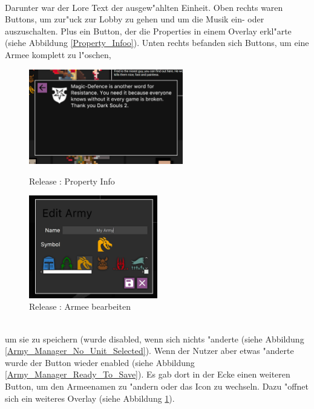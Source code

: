 \documentclass[12pt, titlepage]{scrartcl}
\newcommand{\RN}[1]{%
	\textup{\uppercase\expandafter{\romannumeral#1}}%
}
\begin{document}
			    \ \\ Darunter war der Lore Text der ausgew"ahlten Einheit. Oben rechts waren Buttons, um zur"uck zur Lobby zu gehen und um die Musik ein- oder auszuschalten. Plus ein Button, der die Properties in einem Overlay erkl"arte (siehe Abbildung \ref{Property_Infoo}). Unten rechts befanden sich Buttons, um eine Armee komplett zu l"oschen, \\
			    \begin{figure}[H]
                    \centering
                    \begin{minipage}{0.6\textwidth}
                        \centering
                        \includegraphics[width=0.6\textwidth]{images/old_state/army_manager/PropertyInfo.png}
                        \caption{Release \RN{2}: Property Info}
                        \label{Property_Infoo}
                    \end{minipage}%
                    \begin{minipage}{0.5\textwidth}
                        \centering
                        \includegraphics[width=0.5\textwidth]{images/old_state/army_manager/EditArmy.png}
                        \caption{Release \RN{2}: Armee bearbeiten}
                        \label{Edit_Army}
                    \end{minipage}
                \end{figure}
                \ \\ um sie zu speichern (wurde disabled, wenn sich nichts "anderte (siehe Abbildung \ref{Army_Manager_No_Unit_Selected}). Wenn der Nutzer aber etwas "anderte wurde der Button wieder enabled (siehe Abbildung \ref{Army_Manager_Ready_To_Save}). Es gab dort in der Ecke einen weiteren Button, um den Armeenamen zu "andern oder das Icon zu wechseln. Dazu "offnet sich ein weiteres Overlay (siehe Abbildung \ref{Edit_Army}). \\
\end{document}
